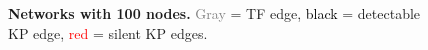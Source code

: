 \begin{frame}
\begin{columns}
\begin{column}{0.6\textwidth}
{\begin{figure}[ht]
    \caption{\textbf{Networks with 100 nodes.} \textcolor{gray}{Gray} = TF edge, \textcolor{black}{black} = detectable KP edge, \textcolor{red}{red} = silent KP edges. }
    \label{fig:dream4_nets100}
\end{figure}}
\end{column}
\end{columns}
\end{frame}

